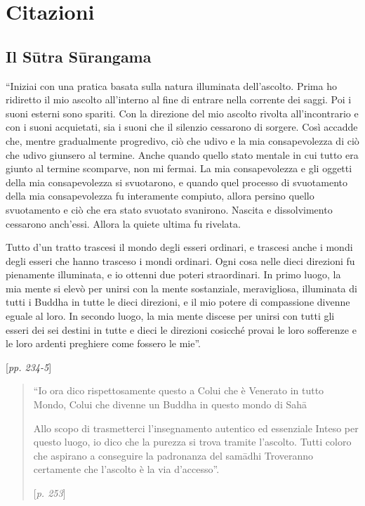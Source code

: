 \chapter{Citazioni}

\setlength{\parindent}{0pt}
\setlength{\parskip}{0.5\baselineskip}

\section*{Il Sūtra Sūrangama}

``Iniziai con una pratica basata sulla natura illuminata dell'ascolto.
Prima ho ridiretto il mio ascolto all'interno al fine di entrare nella
corrente dei saggi. Poi i suoni esterni sono spariti. Con la direzione
del mio ascolto rivolta all'incontrario e con i suoni acquietati, sia i
suoni che il silenzio cessarono di sorgere. Così accadde che, mentre
gradualmente progredivo, ciò che udivo e la mia consapevolezza di ciò
che udivo giunsero al termine. Anche quando quello stato mentale in cui
tutto era giunto al termine scomparve, non mi fermai. La mia
consapevolezza e gli oggetti della mia consapevolezza si svuotarono, e
quando quel processo di svuotamento della mia consapevolezza fu
interamente compiuto, allora persino quello svuotamento e ciò che era
stato svuotato svanirono. Nascita e dissolvimento cessarono anch'essi.
Allora la quiete ultima fu rivelata.

Tutto d'un tratto trascesi il mondo degli esseri ordinari, e trascesi
anche i mondi degli esseri che hanno trasceso i mondi ordinari. Ogni
cosa nelle dieci direzioni fu pienamente illuminata, e io ottenni due
poteri straordinari. In primo luogo, la mia mente si elevò per unirsi
con la mente sostanziale, meravigliosa, illuminata di tutti i Buddha in
tutte le dieci direzioni, e il mio potere di compassione divenne eguale
al loro. In secondo luogo, la mia mente discese per unirsi con tutti gli
esseri dei sei destini in tutte e dieci le direzioni cosicché provai le
loro sofferenze e le loro ardenti preghiere come fossero le mie''.

[\emph{pp. 234-5}]

\clearpage

\begin{quotation}
``Io ora dico rispettosamente questo a Colui che è Venerato in tutto
Mondo, Colui che divenne un Buddha in questo mondo di Sahā

Allo scopo di trasmetterci l'insegnamento autentico ed essenziale Inteso
per questo luogo, io dico che la purezza si trova tramite l'ascolto.
Tutti coloro che aspirano a conseguire la padronanza del samādhi
Troveranno certamente che l'ascolto è la via d'accesso''.

[\emph{p. 253}]
\end{quotation}

